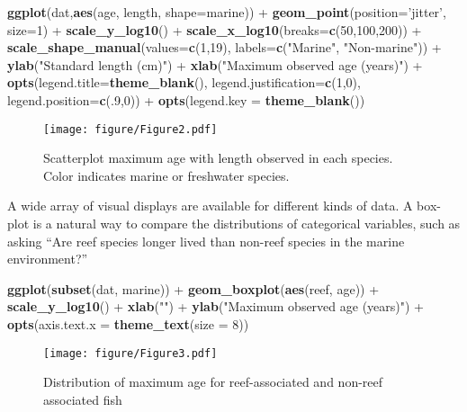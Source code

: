 \documentclass[author-year]{elsarticle} %
\newenvironment{Shaded}{}{}
\newcommand{\KeywordTok}[1]{\textcolor[rgb]{0.00,0.44,0.13}{\textbf{{#1}}}}
\newcommand{\DataTypeTok}[1]{\textcolor[rgb]{0.56,0.13,0.00}{{#1}}}
\newcommand{\DecValTok}[1]{\textcolor[rgb]{0.25,0.63,0.44}{{#1}}}
\newcommand{\StringTok}[1]{\textcolor[rgb]{0.25,0.44,0.63}{{#1}}}
\newcommand{\NormalTok}[1]{{#1}}
\begin{document}
\begin{Shaded}
\begin{Highlighting}[]
\KeywordTok{ggplot}\NormalTok{(dat,}\KeywordTok{aes}\NormalTok{(age, length, }\DataTypeTok{shape=}\NormalTok{marine)) +}
  \KeywordTok{geom_point}\NormalTok{(}\DataTypeTok{position=}\StringTok{'jitter'}\NormalTok{, }\DataTypeTok{size=}\DecValTok{1}\NormalTok{) +}
  \KeywordTok{scale_y_log10}\NormalTok{() + }\KeywordTok{scale_x_log10}\NormalTok{(}\DataTypeTok{breaks=}\KeywordTok{c}\NormalTok{(}\DecValTok{50}\NormalTok{,}\DecValTok{100}\NormalTok{,}\DecValTok{200}\NormalTok{)) +}
  \KeywordTok{scale_shape_manual}\NormalTok{(}\DataTypeTok{values=}\KeywordTok{c}\NormalTok{(}\DecValTok{1}\NormalTok{,}\DecValTok{19}\NormalTok{), }\DataTypeTok{labels=}\KeywordTok{c}\NormalTok{(}\StringTok{"Marine"}\NormalTok{, }\StringTok{"Non-marine"}\NormalTok{)) + }
  \KeywordTok{ylab}\NormalTok{(}\StringTok{"Standard length (cm)"}\NormalTok{) + }\KeywordTok{xlab}\NormalTok{(}\StringTok{"Maximum observed age (years)"}\NormalTok{) +}
  \KeywordTok{opts}\NormalTok{(}\DataTypeTok{legend.title=}\KeywordTok{theme_blank}\NormalTok{(), }\DataTypeTok{legend.justification=}\KeywordTok{c}\NormalTok{(}\DecValTok{1}\NormalTok{,}\DecValTok{0}\NormalTok{), }\DataTypeTok{legend.position=}\KeywordTok{c}\NormalTok{(.}\DecValTok{9}\NormalTok{,}\DecValTok{0}\NormalTok{)) +}
  \KeywordTok{opts}\NormalTok{(}\DataTypeTok{legend.key =} \KeywordTok{theme_blank}\NormalTok{())}
\end{Highlighting}
\end{Shaded}
\begin{figure}[htbp]
\centering
\texttt{[image: figure/Figure2.pdf]}
\caption{Scatterplot maximum age with length observed in each species.
Color indicates marine or freshwater species.}
\end{figure}

A wide array of visual displays are available for different kinds of
data. A box-plot is a natural way to compare the distributions of
categorical variables, such as asking ``Are reef species longer lived
than non-reef species in the marine environment?''

\begin{Shaded}
\begin{Highlighting}[]
\KeywordTok{ggplot}\NormalTok{(}\KeywordTok{subset}\NormalTok{(dat, marine)) + }
  \KeywordTok{geom_boxplot}\NormalTok{(}\KeywordTok{aes}\NormalTok{(reef, age)) + }
  \KeywordTok{scale_y_log10}\NormalTok{() + }\KeywordTok{xlab}\NormalTok{(}\StringTok{""}\NormalTok{) +}
  \KeywordTok{ylab}\NormalTok{(}\StringTok{"Maximum observed age (years)"}\NormalTok{)  +}
  \KeywordTok{opts}\NormalTok{(}\DataTypeTok{axis.text.x =} \KeywordTok{theme_text}\NormalTok{(}\DataTypeTok{size =} \DecValTok{8}\NormalTok{))}
\end{Highlighting}
\end{Shaded}
\begin{figure}[htbp]
\centering
\texttt{[image: figure/Figure3.pdf]}
\caption{Distribution of maximum age for reef-associated and non-reef
associated fish}
\end{figure}
\end{document}
